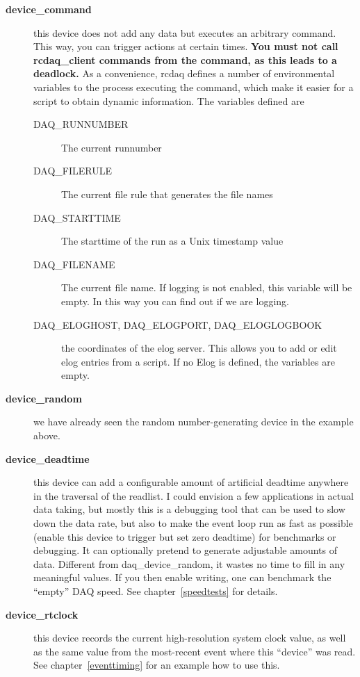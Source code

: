 \documentclass{article}[11pt]
\begin{document}
\begin{description}
\item[\bf device\_command] this device does not add any data but executes
  an arbitrary command.  This way, you can trigger actions at certain
  times.  {\bf You must not call rcdaq\_client commands from the
    command, as this leads to a deadlock.} As a convenience, rcdaq
  defines a number of environmental variables to the process executing
  the command, which make it easier for a script to obtain dynamic
  information. The variables defined are \label{environment}
  \begin{description}
  \item[DAQ\_RUNNUMBER] The current runnumber
    
  \item[DAQ\_FILERULE]  The current file rule that generates the file names 
    
  \item[DAQ\_STARTTIME] The starttime of the run as a Unix timestamp value
    
  \item[DAQ\_FILENAME] The current file name. If logging is not
    enabled, this variable will be empty. In this way you can find out
    if we are logging.
    
  \item[DAQ\_ELOGHOST, DAQ\_ELOGPORT, DAQ\_ELOGLOGBOOK] the coordinates
    of the elog server. This allows you to add or edit elog entries
    from a script. If no Elog is defined, the variables are empty. 
  \end{description}

\item[\bf device\_random] we have already seen the random
  number-generating device in the example above.

\item[\bf device\_deadtime] this device can add a configurable amount
  of artificial deadtime anywhere in the traversal of the readlist.  I
  could envision a few applications in actual data taking, but mostly
  this is a debugging tool that can be used to slow down the data
  rate, but also to make the event loop run as fast as possible
  (enable this device to trigger but set zero deadtime) for benchmarks
  or debugging. It can optionally pretend to generate adjustable
  amounts of data. Different from daq\_device\_random, it wastes no
  time to fill in any meaningful values. If you then enable writing,
  one can benchmark the ``empty'' DAQ speed. See
  chapter~\ref{speedtests} for details.

\item[\bf device\_rtclock] this device records the current
  high-resolution system clock value, as well as the same value from
  the most-recent event where this ``device'' was read. See
  chapter~\ref{eventtiming} for an example how to use this. 

\end{description}
\end{document}
